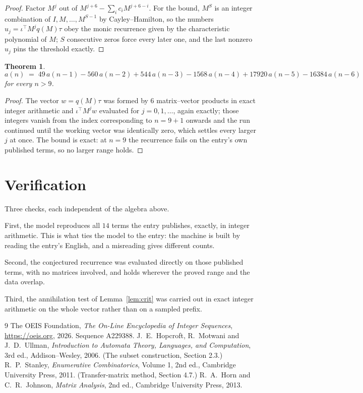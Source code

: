 \documentclass[11pt,a4paper]{article}
\theoremstyle{plain}
\newtheorem{theorem}{Theorem}
\theoremstyle{definition}
\begin{document}
\begin{proof}
Factor $M^{j}$ out of $M^{j+6}-\sum_ic_iM^{j+6-i}$. For the bound, $M^{S}$
is an integer combination of $I,M,\dots,M^{S-1}$ by Cayley--Hamilton, so the numbers
$u_j=\iota^{\!\top}M^{j}q(M)\tau$ obey the monic recurrence given by the characteristic
polynomial of $M$; $S$ consecutive zeros force every later one, and the last nonzero $u_j$
pins the threshold exactly.
\end{proof}

\begin{theorem}
\[
a(n)\;=\;49\,a(n-1) - 560\,a(n-2) + 544\,a(n-3) - 1568\,a(n-4) + 17920\,a(n-5) - 16384\,a(n-6)
\]
for every $n>9$.
\end{theorem}

\begin{proof}
The vector $w=q(M)\tau$ was formed by $6$ matrix--vector products in exact integer
arithmetic and $\iota^{\!\top}M^{j}w$ evaluated for $j=0,1,\dots$, again exactly; those
integers vanish from the index corresponding to $n=9+1$ onwards and the run continued
until the working vector was identically zero, which settles every larger $j$ at once. The bound is exact: at $n=9$ the recurrence fails on the entry's own published terms, so no larger range holds.
\end{proof}

\section{Verification}

Three checks, each independent of the algebra above.

First, the model reproduces all $14$ terms the entry publishes, exactly, in integer
arithmetic. This is what ties the model to the entry: the machine is built by reading the
entry's English, and a misreading gives different counts.

Second, the conjectured recurrence was evaluated directly on those published terms, with no
matrices involved, and holds wherever the proved range and the data overlap.

Third, the annihilation test of Lemma~\ref{lem:crit} was carried out in exact integer
arithmetic on the whole vector rather than on a sampled prefix.

\begin{thebibliography}{9}
 The OEIS Foundation, \emph{The On-Line Encyclopedia of Integer
Sequences}, \url{https://oeis.org}, 2026. Sequence A229388.
 J.~E.~Hopcroft, R.~Motwani and J.~D.~Ullman, \emph{Introduction to Automata
Theory, Languages, and Computation}, 3rd ed., Addison--Wesley, 2006. (The subset
construction, Section 2.3.)
 R.~P.~Stanley, \emph{Enumerative Combinatorics}, Volume 1, 2nd ed.,
Cambridge University Press, 2011. (Transfer-matrix method, Section 4.7.)
 R.~A.~Horn and C.~R.~Johnson, \emph{Matrix Analysis}, 2nd ed., Cambridge
University Press, 2013.
\end{thebibliography}
\end{document}
